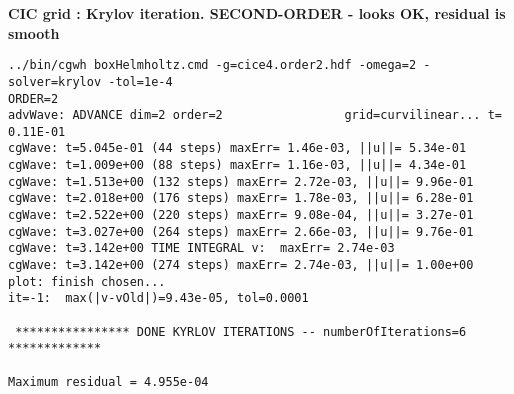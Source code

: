 \bigskip
\textbf{CIC grid  : Krylov iteration. SECOND-ORDER  - looks OK, residual is smooth}
\begin{Verbatim}[fontsize=\scriptsize]
  ../bin/cgwh boxHelmholtz.cmd -g=cice4.order2.hdf -omega=2 -solver=krylov -tol=1e-4
ORDER=2
advWave: ADVANCE dim=2 order=2                 grid=curvilinear... t=  0.11E-01
cgWave: t=5.045e-01 (44 steps) maxErr= 1.46e-03, ||u||= 5.34e-01 
cgWave: t=1.009e+00 (88 steps) maxErr= 1.16e-03, ||u||= 4.34e-01 
cgWave: t=1.513e+00 (132 steps) maxErr= 2.72e-03, ||u||= 9.96e-01 
cgWave: t=2.018e+00 (176 steps) maxErr= 1.78e-03, ||u||= 6.28e-01 
cgWave: t=2.522e+00 (220 steps) maxErr= 9.08e-04, ||u||= 3.27e-01 
cgWave: t=3.027e+00 (264 steps) maxErr= 2.66e-03, ||u||= 9.76e-01 
cgWave: t=3.142e+00 TIME INTEGRAL v:  maxErr= 2.74e-03
cgWave: t=3.142e+00 (274 steps) maxErr= 2.74e-03, ||u||= 1.00e+00 
plot: finish chosen...
it=-1:  max(|v-vOld|)=9.43e-05, tol=0.0001

 **************** DONE KYRLOV ITERATIONS -- numberOfIterations=6 *************

Maximum residual = 4.955e-04
\end{Verbatim}








